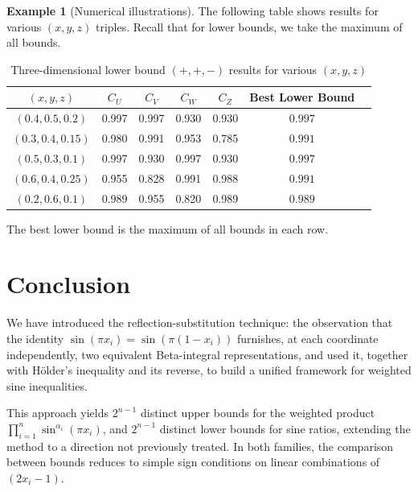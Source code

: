 \documentclass[12pt]{amsart}
\theoremstyle{definition}
\newtheorem{example}{Example}[section]
\begin{document}
\begin{example}[Numerical illustrations]
The following table shows results for various $(x,y,z)$ triples. Recall that for lower bounds, we take the maximum of all bounds.

\begin{table}[h]
\centering
\caption{Three-dimensional lower bound $(+,+,-)$ results for various $(x,y,z)$}
\label{tab:3d-lower-ppminus-multi}
\begin{tabular}{|c|c|c|c|c|c|c|}
\hline
$(x,y,z)$ & $C_U$ & $C_V$ & $C_W$ & $C_Z$ & Best Lower Bound \\
\hline
$(0.4,0.5,0.2)$ & 0.997 & 0.997 & 0.930 & 0.930 & $0.997$ \\
$(0.3,0.4,0.15)$ & 0.980 & 0.991 & 0.953 & 0.785  & $0.991$ \\
$(0.5,0.3,0.1)$ & 0.997 & 0.930 & 0.997 & 0.930 &  $ 0.997$ \\
$(0.6,0.4,0.25)$ & 0.955 & 0.828 & 0.991 & 0.988 & $ 0.991$ \\
$(0.2,0.6,0.1)$ & 0.989 & 0.955 & 0.820 & 0.989 & $ 0.989$ \\
\hline
\end{tabular}
\end{table}
\noindent The best lower bound is the maximum of all bounds in each row.
\end{example}


\section{Conclusion}
\label{sec:conclusion}

We have introduced the reflection-substitution technique: the observation that the identity $\sin(\pi x_i) = \sin(\pi(1-x_i))$ furnishes, at each coordinate independently, two equivalent Beta-integral representations, and used it, together with H\"older's inequality and its reverse, to build a unified framework for weighted sine inequalities.

This approach yields $2^{n-1}$ distinct upper bounds for the weighted product $\displaystyle\prod_{i=1}^n\sin^{\alpha_i}(\pi x_i)$, and  $2^{n-1}$ distinct lower bounds for sine ratios, extending the method to a direction not previously treated. In both families, the comparison between bounds reduces to simple sign conditions on linear combinations of $(2x_i-1)$.
\end{document}
